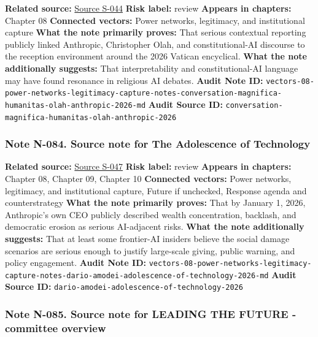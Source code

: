 \documentclass[
  american,
  11pt,
  letterpaper,
]{article}
\begin{document}
\textbf{Related source:}
\hyperref[source-s-044-magnifica-humanitas-el-papel-de-christopher-olah-y-anthropic-en-la-enc-clica-sobre-la-ia-del-papa-le-n-xiv]{Source
S-044} \textbf{Risk label:} review \textbf{Appears in chapters:} Chapter
08 \textbf{Connected vectors:} Power networks, legitimacy, and
institutional capture \textbf{What the note primarily proves:} That
serious contextual reporting publicly linked Anthropic, Christopher
Olah, and constitutional-AI discourse to the reception environment
around the 2026 Vatican encyclical. \textbf{What the note additionally
suggests:} That interpretability and constitutional-AI language may have
found resonance in religious AI debates. \textbf{Audit Note ID:}
\texttt{vectors-08-power-networks-legitimacy-capture-notes-conversation-magnifica-humanitas-olah-anthropic-2026-md}
\textbf{Audit Source ID:}
\texttt{conversation-magnifica-humanitas-olah-anthropic-2026}

\subsubsection{Note N-084. Source note for The Adolescence of
Technology}\label{note-n-084-vectors-08-power-networks-legitimacy-capture-notes-dario-amodei-adolescence-of-technology-2026-md}

\textbf{Related source:}
\hyperref[source-s-047-the-adolescence-of-technology]{Source S-047}
\textbf{Risk label:} review \textbf{Appears in chapters:} Chapter 08,
Chapter 09, Chapter 10 \textbf{Connected vectors:} Power networks,
legitimacy, and institutional capture, Future if unchecked, Response
agenda and counterstrategy \textbf{What the note primarily proves:} That
by January 1, 2026, Anthropic's own CEO publicly described wealth
concentration, backlash, and democratic erosion as serious AI-adjacent
risks. \textbf{What the note additionally suggests:} That at least some
frontier-AI insiders believe the social damage scenarios are serious
enough to justify large-scale giving, public warning, and policy
engagement. \textbf{Audit Note ID:}
\texttt{vectors-08-power-networks-legitimacy-capture-notes-dario-amodei-adolescence-of-technology-2026-md}
\textbf{Audit Source ID:}
\texttt{dario-amodei-adolescence-of-technology-2026}

\subsubsection{Note N-085. Source note for LEADING THE FUTURE -
committee
overview}\label{note-n-085-vectors-08-power-networks-legitimacy-capture-notes-fec-leading-the-future-committee-overview-2026-md}
\end{document}
